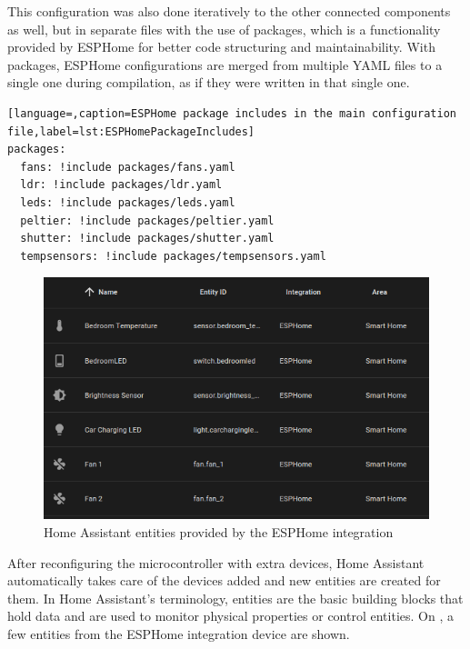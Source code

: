 This configuration was also done iteratively to the other connected components as well, but in separate files with the use of packages, which is a functionality provided by ESPHome for better code structuring and maintainability. With packages, ESPHome configurations are merged from multiple YAML files to a single one during compilation, as if they were written in that single one.

\begin{lstlisting}[language=,caption=ESPHome package includes in the main configuration file,label=lst:ESPHomePackageIncludes]
packages:
  fans: !include packages/fans.yaml
  ldr: !include packages/ldr.yaml
  leds: !include packages/leds.yaml
  peltier: !include packages/peltier.yaml
  shutter: !include packages/shutter.yaml
  tempsensors: !include packages/tempsensors.yaml
\end{lstlisting}

\begin{figure}[!ht]
  \centering
  \includegraphics[width=150mm, keepaspectratio]{figures/esphome_entities.png}
  \caption{Home Assistant entities provided by the ESPHome integration}
  \label{fig:HAesphomeEntities}
\end{figure}

After reconfiguring the microcontroller with extra devices, Home Assistant automatically takes care of the devices added and new entities are created for them. In Home Assistant's terminology, entities are the basic building blocks that hold data and are used to monitor physical properties or control entities. \cite{HAConceptsTerminology} On , a few entities from the ESPHome integration device are shown. 

